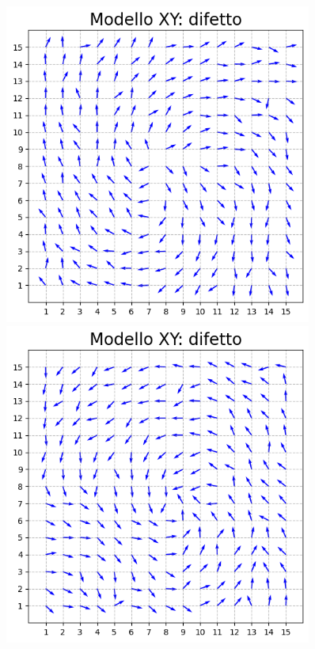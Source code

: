 \vspace*{\fill}

\vspace*{\fill}

\begin{figure}[H]
    \centering
    \begin{minipage}{0.45\textwidth}  
      \centering
      \includegraphics[page=1, width=0.9\textwidth]{Immagini/simModelloXY/difetto1.png}
    \end{minipage}\hfill
    \begin{minipage}{0.45\textwidth}  
      \centering
      \includegraphics[page=1, width=0.9\textwidth]{Immagini/simModelloXY/difetto2.png}
    \end{minipage}
    \vspace{12pt}


\end{figure}
